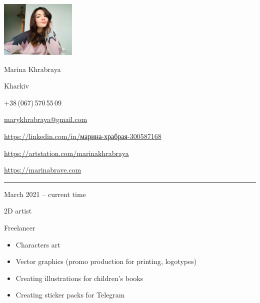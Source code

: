 \documentclass[a4paper,10pt]{article}
\newlength{\cvcolumngapwidth}
\newlength{\cvleftcolumnwidth}
\newlength{\cvrightcolumnwidth}
\newcommand{\cvnamestyle}[1]{{\Large\cvnamefont\textcolor{cvnamecolor}{#1}}}
\newcommand{\cvsectionstyle}[1]{{\normalsize\cvsectionfont\textcolor{cvsectioncolor}{#1}}}
\newcommand{\cvtitlestyle}[1]{{\large\cvtitlefont\textcolor{cvtitlecolor}{#1}}}
\newcommand{\cvdurationstyle}[1]{{\small\cvdurationfont\textcolor{cvdurationcolor}{#1}}}
\newlength{\cvafteritemskipamount}
\newlength{\cvaftersectionskipamount}
\newlength{\cvafternameskipamount}
\newlength{\cvafterpersonalinfolineskipamount}
\newlength{\cvaftertitleskipamount}
\newlength{\cvparskip}
\newcommand{\cvpersonalinfo}[2]{
\begin{minipage}[t]{\cvleftcolumnwidth}
    \vspace{0mm} %
    \raggedleft #1
\end{minipage}%
\hspace{\cvcolumngapwidth}%
\begin{minipage}[t]{\cvrightcolumnwidth}
    \vspace{0mm} %
    #2
\end{minipage}

\vspace{\cvafteritemskipamount}
}
\newcommand{\cvname}[1]{
\cvnamestyle{#1}

\vspace{\cvafternameskipamount}
}
\newcommand{\cvpersonalinfolinewithicon}[3]{
\raisebox{.5\fontcharht\font`E-.5\height}{\texttt{[image: \#2]}}
#3

\vspace{\cvafterpersonalinfolineskipamount}
}
\newcommand{\cvsection}[1]{
\begin{minipage}[t]{\cvleftcolumnwidth}
    \raggedleft\cvsectionstyle{#1}
\end{minipage}%
\hspace{\cvcolumngapwidth}%
\begin{minipage}[t]{\cvrightcolumnwidth}
    \textcolor{cvrulecolor}{\rule{\cvrightcolumnwidth}{0.3mm}}
\end{minipage}

\vspace{\cvaftersectionskipamount}
}
\newcommand{\cvitem}[2]{
\begin{minipage}[t]{\cvleftcolumnwidth}
    \raggedleft #1
\end{minipage}%
\hspace{\cvcolumngapwidth}%
\begin{minipage}[t]{\cvrightcolumnwidth}
    \setlength{\parskip}{\cvparskip} #2
\end{minipage}

\vspace{\cvafteritemskipamount}
}
\newcommand{\cvtitle}[1]{
\cvtitlestyle{#1}

\vspace{\cvaftertitleskipamount}
\vspace{-\cvparskip}
}
\begin{document}

\cvpersonalinfo{
\includegraphics[trim={36cm 20cm 25cm 0cm},clip,width=36mm]{resources/photo.jpg}
}{
\cvname{Marina Khrabraya}

\cvpersonalinfolinewithicon{height=4mm}{resources/IcoMoon-Free-PDF/072-location.pdf}{
Kharkiv
}

\cvpersonalinfolinewithicon{height=4mm}{resources/IcoMoon-Free-PDF/067-phone.pdf}{
+38\,(067)\,570\,55\,09
}

\cvpersonalinfolinewithicon{height=4mm}{resources/IcoMoon-Free-PDF/070-envelop.pdf}{
\href{mailto://marykhrabraya@gmail.com}{marykhrabraya@gmail.com}
}

\cvpersonalinfolinewithicon{height=4mm}{resources/IcoMoon-Free-PDF/458-linkedin.pdf}{
\href{https://www.linkedin.com/in/\%D0\%BC\%D0\%B0\%D1\%80\%D0\%B8\%D0\%BD\%D0\%B0-\%D1\%85\%D1\%80\%D0\%B0\%D0\%B1\%D1\%80\%D0\%B0\%D1\%8F-300587168/}{https://linkedin.com/in/марина-храбрая-300587168}
}

\cvpersonalinfolinewithicon{height=4mm}{"resources/ArtStationLogo/vector/ArtStation-logomark-dark.eps"}{
\href{https://artstation.com/marinakhrabraya}{https://artstation.com/marinakhrabraya}
}

\cvpersonalinfolinewithicon{height=4mm}{resources/IcoMoon-Free-PDF/203-earth.pdf}{
\href{https://marinabrave.com}{https://marinabrave.com}
}
}



\cvsection{WORK EXPERIENCE}

\cvitem{
\cvdurationstyle{March 2021 -- current time}
}{
\cvtitle{2D artist}

Freelancer

\begin{itemize}[leftmargin=*]
    \item Characters art
    \item Vector graphics (promo production for printing, logotypes)
    \item Creating illustrations for children's books 
    \item Creating sticker packs for Telegram
\end{itemize}
}
\end{document}
